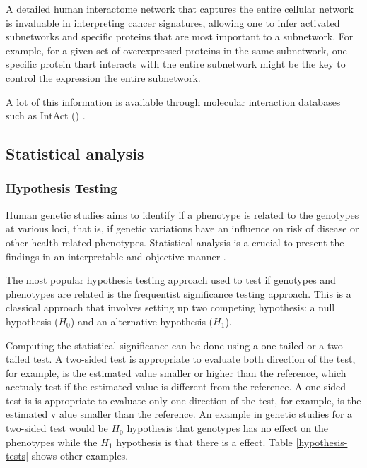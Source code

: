  A detailed human interactome network that captures the entire cellular network is invaluable in interpreting cancer signatures, allowing one to infer activated subnetworks and specific proteins that are most important to a subnetwork. For example, for a given set of overexpressed proteins in the same subnetwork, one specific protein thart interacts with the entire subnetwork might be the key to control the expression the entire subnetwork.

 A lot of this information is available through molecular interaction databases such as IntAct () \cite{orchard2013mintact}.  



\subsection{Statistical analysis}

\subsubsection{Hypothesis Testing}

Human genetic studies aims to identify if a phenotype is related to the genotypes
at various loci, that is, if genetic variations have an influence on risk of
disease or other health-related phenotypes.
Statistical analysis is a crucial to present the findings in an
interpretable and objective manner \cite{sham2014statistical}.

The most popular hypothesis testing approach used to test if
genotypes and phenotypes are related  is the frequentist significance testing approach.
This is a classical approach that involves setting up two competing hypothesis: a
null hypothesis ($H_0$) and an alternative hypothesis ($H_1$).

Computing the statistical significance can be done using a one-tailed or a two-tailed test.
A two-sided test is appropriate to evaluate both direction of the test, for example,
is the estimated value smaller or higher than the reference, which acctualy test if the
 estimated value is different from the reference.
A one-sided test is  is appropriate to evaluate only one direction of the test,
for example, is the estimated v alue smaller than the reference.
An example in genetic studies for a two-sided test would be $H_0$
hypothesis that genotypes has no effect on the phenotypes
while the $H_1$ hypothesis is that there is a effect.
Table \ref{hypothesis-tests} shows other examples.

